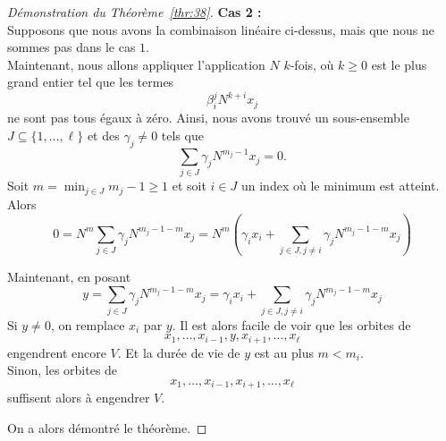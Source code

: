 \begin{proof}[Démonstration du Théorème~\ref{thr:38}]
\textbf{Cas 2 :} \\
Supposons que nous avons la combinaison linéaire ci-dessus, mais que nous ne sommes pas dans le cas $1$. \\
Maintenant, nous allons appliquer l'application $N$ $k$-fois, où $k \geq 0$ est le plus grand entier tel que les termes 
\begin{displaymath}
  β_i^j N^{k+i}x_j 
\end{displaymath}
ne sont pas tous égaux à zéro. Ainsi, nous avons trouvé un sous-ensemble $J ⊆ \{1,\dots,\ell \}$ et des $γ_j ≠ 0$ tels que 
\begin{displaymath}
  \sum_{j \in J} γ_j N^{m_j-1}x_j = 0.
\end{displaymath}
Soit $m = \min_{j \in J} {m_j-1} \geq 1$ et soit $i \in J$ un index où le minimum est atteint. Alors 
\begin{displaymath}
 0 =  N^m  \sum_{j \in J} γ_j N^{m_j-1 - m}x_j  = N^m \left( γ_i x_i + \sum_{j \in J, j \neq i} γ_j N^{m_j-1 - m}x_j \right)
\end{displaymath}

Maintenant, en posant $$y = \sum_{j \in J} γ_j N^{m_j-1 - m}x_j = γ_i x_i + \sum_{j \in J, j \neq i} γ_j N^{m_j-1 - m}x_j$$ 
Si $y \neq 0$, on remplace $x_i$ par $y$.
Il est alors facile de voir que les orbites de 
\begin{displaymath}
  x_1,\dots, x_{i-1},y,x_{i+1},\dots,x_\ell
\end{displaymath}
engendrent encore $V$. Et la durée de vie de $y$ est au plus $m<m_i$. \\
Sinon, les orbites de
\begin{displaymath}
  x_1,\dots, x_{i-1},x_{i+1},\dots,x_\ell
\end{displaymath}
suffisent alors à engendrer $V$.

On a alors démontré le théorème.  
\end{proof}


